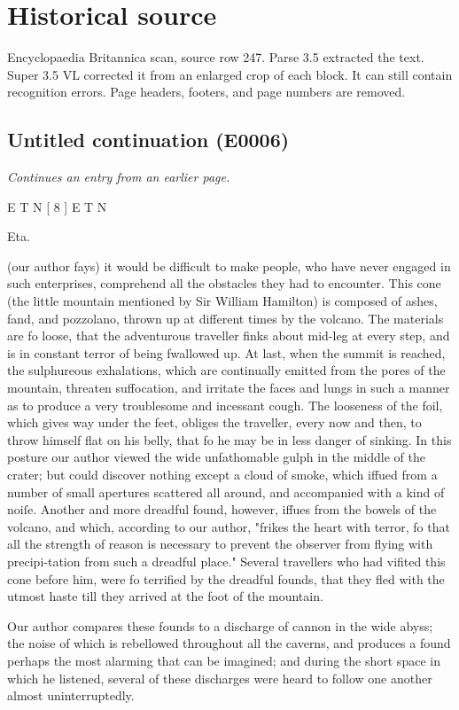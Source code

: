 \documentclass{article}
\begin{document}
\section*{Historical source}
Encyclopaedia Britannica scan, source row 247. Parse 3.5 extracted the text. Super 3.5 VL corrected it from an enlarged crop of each block. It can still contain recognition errors.
Page headers, footers, and page numbers are removed.

\subsection*{Untitled continuation (E0006)}
\textit{Continues an entry from an earlier page.}

E T N [ 8 ] E T N

Eta.

(our author fays) it would be difficult to make people, who have never engaged in such enterprises, comprehend all the obstacles they had to encounter. This cone (the little mountain mentioned by Sir William Hamilton) is composed of ashes, fand, and pozzolano, thrown up at different times by the volcano. The materials are fo loose, that the adventurous traveller finks about mid-leg at every step, and is in constant terror of being fwallowed up. At last, when the summit is reached, the sulphureous exhalations, which are continually emitted from the pores of the mountain, threaten suffocation, and irritate the faces and lungs in such a manner as to produce a very troublesome and incessant cough. The looseness of the foil, which gives way under the feet, obliges the traveller, every now and then, to throw himself flat on his belly, that fo he may be in less danger of sinking. In this posture our author viewed the wide unfathomable gulph in the middle of the crater; but could discover nothing except a cloud of smoke, which iffued from a number of small apertures scattered all around, and accompanied with a kind of noiſe. Another and more dreadful found, however, iffues from the bowels of the volcano, and which, according to our author, "frikes the heart with terror, fo that all the strength of reason is necessary to prevent the observer from flying with precipi-tation from such a dreadful place." Several travellers who had vifited this cone before him, were fo terrified by the dreadful founds, that they fled with the utmost haste till they arrived at the foot of the mountain.

Our author compares these founds to a discharge of cannon in the wide abyss; the noise of which is rebellowed throughout all the caverns, and produces a found perhaps the most alarming that can be imagined; and during the short space in which he listened, several of these discharges were heard to follow one another almost uninterruptedly.
\end{document}
